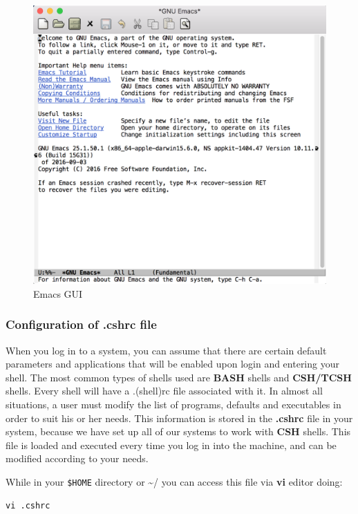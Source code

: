 \documentclass[11pt]{article}
\begin{document}
\begin{enumerate}
\begin{figure}[htb]
\centering
\includegraphics[width=.9\linewidth]{./figures/emacs.png}
\caption{Emacs GUI}
\end{figure}
\end{enumerate}

\subsubsection{Configuration of .cshrc file}
\label{sec-2-1-5}
When you log in to a system, you can assume that there are certain default parameters and applications that will be enabled upon login and entering your shell. The most common types of shells used are \textbf{BASH} shells and \textbf{CSH/TCSH} shells. Every shell will have a .(shell)rc file associated with it. In almost all situations, a user must modify the list of programs, defaults and executables in order to suit his or her needs. This information is stored in the \textbf{.cshrc} file in your system, because we have set up all of our systems to work with \textbf{CSH} shells. 
This file is loaded and executed every time you log in into the machine, and can be modified according to your needs.

While in your \texttt{\$HOME} directory or \textasciitilde{}/ you can access this file via \textbf{vi} editor doing:
\begin{verbatim}
vi .cshrc
\end{verbatim}
\end{document}
